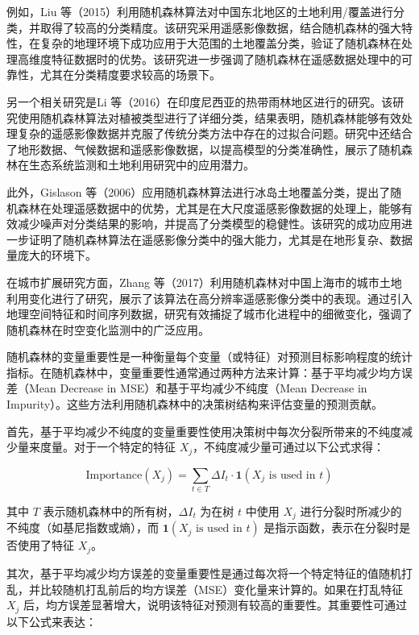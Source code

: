 \documentclass[AutoFakeBold]{LZUThesis-PgD&PhD}
\begin{document}
	例如，Liu 等（2015）利用随机森林算法对中国东北地区的土地利用/覆盖进行分类，并取得了较高的分类精度。该研究采用遥感影像数据，结合随机森林的强大特性，在复杂的地理环境下成功应用于大范围的土地覆盖分类，验证了随机森林在处理高维度特征数据时的优势\cite{liu2015}。该研究进一步强调了随机森林在遥感数据处理中的可靠性，尤其在分类精度要求较高的场景下。
	
	另一个相关研究是Li 等（2016）在印度尼西亚的热带雨林地区进行的研究。该研究使用随机森林算法对植被类型进行了详细分类，结果表明，随机森林能够有效处理复杂的遥感影像数据并克服了传统分类方法中存在的过拟合问题\cite{li2016}。研究中还结合了地形数据、气候数据和遥感影像数据，以提高模型的分类准确性，展示了随机森林在生态系统监测和土地利用研究中的应用潜力。
	
	此外，Gislason 等（2006）应用随机森林算法进行冰岛土地覆盖分类，提出了随机森林在处理遥感数据中的优势，尤其是在大尺度遥感影像数据的处理上，能够有效减少噪声对分类结果的影响，并提高了分类模型的稳健性\cite{gislason2006}。该研究的成功应用进一步证明了随机森林算法在遥感影像分类中的强大能力，尤其是在地形复杂、数据量庞大的环境下。
	
	在城市扩展研究方面，Zhang 等（2017）利用随机森林对中国上海市的城市土地利用变化进行了研究，展示了该算法在高分辨率遥感影像分类中的表现\cite{zhang2017}。通过引入地理空间特征和时间序列数据，研究有效捕捉了城市化进程中的细微变化，强调了随机森林在时空变化监测中的广泛应用。
	
	随机森林的变量重要性是一种衡量每个变量（或特征）对预测目标影响程度的统计指标。在随机森林中，变量重要性通常通过两种方法来计算：基于平均减少均方误差（Mean Decrease in MSE）和基于平均减少不纯度（Mean Decrease in Impurity）。这些方法利用随机森林中的决策树结构来评估变量的预测贡献。
	
	首先，基于平均减少不纯度的变量重要性使用决策树中每次分裂所带来的不纯度减少量来度量。对于一个特定的特征 \( X_j \)，不纯度减少量可通过以下公式求得：
	
	\[
	\text{Importance}(X_j) = \sum_{t \in T} \Delta I_t \cdot \mathbf{1}(X_j \text{ is used in } t)
	\]
	
	其中 \( T \) 表示随机森林中的所有树，\( \Delta I_t \) 为在树 \( t \) 中使用 \( X_j \) 进行分裂时所减少的不纯度（如基尼指数或熵），而 \( \mathbf{1}(X_j \text{ is used in } t) \) 是指示函数，表示在分裂时是否使用了特征 \( X_j \)。
	
	其次，基于平均减少均方误差的变量重要性是通过每次将一个特定特征的值随机打乱，并比较随机打乱前后的均方误差（MSE）变化量来计算的。如果在打乱特征 \( X_j \) 后，均方误差显著增大，说明该特征对预测有较高的重要性。其重要性可通过以下公式来表达：
	
\end{document}
